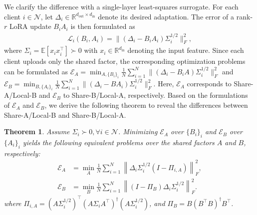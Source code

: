 \documentclass[lettersize,journal]{IEEEtran}
\newtheorem{theorem}{Theorem}
\begin{document}
	We clarify the difference with a single-layer least-squares
	surrogate. For each client $i \in \mathcal{N}$, let
	$\Delta_i\in\mathbb{R}^{d_{\mathrm{out}}\times d_{\mathrm{in}}}$
	denote its desired adaptation. The error of a rank-$r$ LoRA update
	$B_iA_i$ is then formulated as
	\begin{align}
		\mathcal{L}_i(B_i,A_i)
		=
		\|(\Delta_i-B_iA_i)\Sigma_i^{1/2}\|_F^2,
		\label{eq:ls_surrogate_loss}
	\end{align}
	where $\Sigma_i=\mathbb{E}[x_ix_i^\top]\succ0$ with $x_i\in\mathbb{R}^{d_{\mathrm{in}}}$ denoting the input feature. 
	Since each client uploads only the shared factor, the corresponding optimization problems can be formulated as 
	$\mathcal{E}_A=
	\min_{A,\{B_i\}_i}
	\frac{1}{N}
	\sum_{i=1}^{N}
	\|(\Delta_i-B_iA)\Sigma_i^{1/2}\|_F^2$ and $\mathcal{E}_B =
	\min_{B,\{A_i\}_i}
	\frac{1}{N}
	\sum_{i=1}^{N}
	\|(\Delta_i-BA_i)\Sigma_i^{1/2}\|_F^2$. Here, $\mathcal{E}_A$ corresponds to Share-A/Local-B and
	$\mathcal{E}_B$ to Share-B/Local-A, respectively.
	Based on the formulations of $\mathcal{E}_A$ and $\mathcal{E}_B$, we derive the following theorem to reveal the differences between Share-A/Local-B and  Share-B/Local-A.
	\begin{theorem}
		\label{thm:projection_characterization}
		Assume $\Sigma_i\succ0,\forall i \in \mathcal{N}$. Minimizing $\mathcal{E}_A$ over $\{B_i\}_i$ and $\mathcal{E}_B$ over $\{A_i\}_i$ yields the following equivalent problems over the shared factors $A$ and $B$, respectively:
		\begin{align}
			\mathcal{E}_A
			&=
			\min_A
			\frac{1}{N}
			\sum_{i=1}^{N}
			\left\|
			\Delta_i\Sigma_i^{1/2}(I-\Pi_{i,A})
			\right\|_F^2,
			\label{eq:pa_projection}\\
			\mathcal{E}_B
			&=
			\min_B
			\frac{1}{N}
			\sum_{i=1}^{N}
			\left\|
			(I-\Pi_B)\Delta_i\Sigma_i^{1/2}
			\right\|_F^2.
			\label{eq:pb_projection}
		\end{align}
		where  $\Pi_{i,A}=
		(A\Sigma_i^{1/2})^\top
		(A\Sigma_iA^\top)^\dagger
		(A\Sigma_i^{1/2})$, and $\Pi_B=
		B(B^\top B)^\dagger B^\top$.
	\end{theorem}
\end{document}
